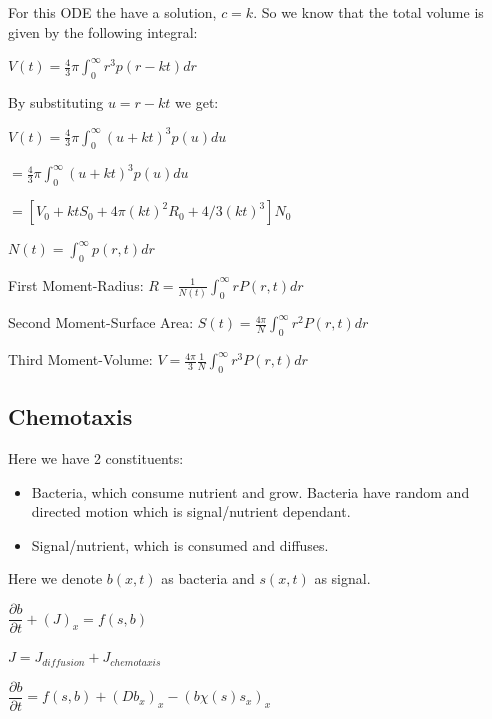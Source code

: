 \documentclass[]{article}
\numberwithin{equation}{section}		%
\begin{document}
For this ODE the have a solution, $c=k$. So we know that the total volume is given by the following integral:

\begin{center}
$V(t) = \frac{4}{3}\pi \int_{0}^{\infty} r^{3}p(r-kt)dr $
\end{center}
By substituting $u= r-kt$ we get:

\begin{center}
$V(t) = \frac{4}{3}\pi \int_{0}^{\infty}(u+kt)^{3}p(u)du $
\end{center}

\begin{center}
 $= \frac{4}{3}\pi \int_{0}^{\infty}(u+kt)^{3}p(u)du $
\end{center}

\begin{center}
$ = [V_{0} + ktS_{0}+4\pi(kt)^{2}R_{0}+4/3(kt)^{3}] N_{0}$
\end{center}

\begin{center}
$N(t) = \int_{0}^{\infty}p(r,t)dr$
\end{center}

\noindent First Moment-Radius:
$R = \frac{1}{N (t )}\int _{0}^{\infty} rP (r,t )dr$

\noindent Second Moment-Surface Area:
$S (t )=\frac{4\pi}{N}\int _{0}^{\infty} r^{2}P (r,t )dr$

\noindent Third Moment-Volume:
$V = \frac{4\pi}{3}\frac{1}{N}\int _{0}^{\infty} r^{3}P (r,t )dr$

\subsection{Chemotaxis}
Here we have 2 constituents:
\begin{itemize}
	\item Bacteria, which consume nutrient and grow. Bacteria have random and directed motion which is signal/nutrient dependant.
	\item Signal/nutrient, which is consumed and diffuses.
\end{itemize}

Here we denote $b(x,t)$ as bacteria and $s(x,t)$ as signal.
\begin{center}
$\dfrac{\partial b}{\partial t} + (J)_{x}=f(s,b)$
\end{center}
\begin{center}
$J=J_{diffusion}+J_{chemotaxis}$
\end{center}
\begin{center}
$\dfrac{\partial b}{\partial t}=f(s,b)+(Db_{x})_{x}-(b\chi(s)s_{x})_{x}$
\end{center}
\end{document}
